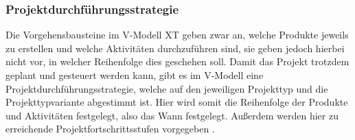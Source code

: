  \subsubsection{Projektdurchführungsstrategie}
 Die Vorgehensbausteine im V-Modell XT geben zwar an, welche Produkte jeweils zu erstellen und welche Aktivitäten durchzuführen sind, sie geben jedoch hierbei nicht vor, in welcher Reihenfolge dies geschehen soll. Damit das Projekt trotzdem geplant und gesteuert werden kann, gibt es im V-Modell eine Projektdurchführungsstrategie, welche auf den jeweiligen Projekttyp und die Projekttypvariante abgestimmt ist. Hier wird somit die Reihenfolge der Produkte und Aktivitäten festgelegt, also das  \grqq Wann\grqq {} festgelegt. Außerdem werden hier zu erreichende Projektfortschrittsstufen vorgegeben \cite{2004vmodell}. \newline
 

